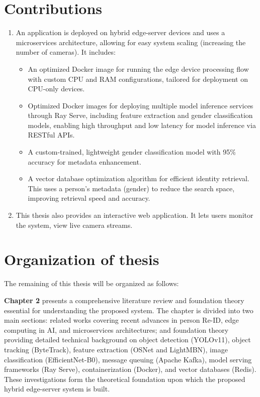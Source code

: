 \documentclass[../main.tex]{subfiles}
\begin{document}
\section{Contributions}
\label{sec:contribution}

\begin{enumerate}
    \item An application is deployed on hybrid edge-server devices and uses a microservices architecture, allowing for easy system scaling (increasing the number of cameras). It includes:
    \begin{itemize}
        \item An optimized Docker image for running the edge device processing flow with custom CPU and RAM configurations, tailored for deployment on CPU-only devices.
        \item Optimized Docker images for deploying multiple model inference services through Ray Serve, including feature extraction and gender classification models, enabling high throughput and low latency for model inference via RESTful APIs.
        \item A custom-trained, lightweight gender classification model with 95\% accuracy for metadata enhancement.
        \item A vector database optimization algorithm for efficient identity retrieval. This uses a person's metadata (gender) to reduce the search space, improving retrieval speed and accuracy.
    \end{itemize} 
\item This thesis also provides an interactive web application. It lets users monitor the system, view live camera streams.
\end{enumerate}

\section{Organization of thesis}
\label{sec:organize}

The remaining of this thesis will be organized as follows:

\textbf{Chapter 2} presents a comprehensive literature review and foundation theory essential for understanding the proposed system. The chapter is divided into two main sections: related works covering recent advances in person Re-ID, edge computing in AI, and microservices architectures; and foundation theory providing detailed technical background on object detection (YOLOv11), object tracking (ByteTrack), feature extraction (OSNet and LightMBN), image classification (EfficientNet-B0), message queuing (Apache Kafka), model serving frameworks (Ray Serve), containerization (Docker), and vector databases (Redis). These investigations form the theoretical foundation upon which the proposed hybrid edge-server system is built.
\end{document}
